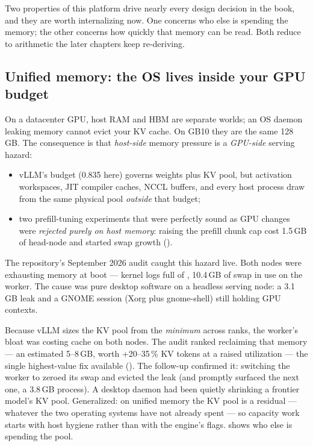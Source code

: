Two properties of this platform drive nearly every design decision in the
book, and they are worth internalizing now. One concerns who else is
spending the memory; the other concerns how quickly that memory can be
read. Both reduce to arithmetic the later chapters keep re-deriving.

\subsection{Unified memory: the OS lives inside your GPU budget}
\label{sec:problem:unified}

On a datacenter GPU, host RAM and HBM are separate worlds; an OS daemon
leaking memory cannot evict your KV cache. On GB10 they are the same
128\,GB. The consequence is that \emph{host-side} memory pressure is a
\emph{GPU-side} serving hazard:

\begin{itemize}
  \item vLLM's  budget (0.835 here) governs
    weights plus KV pool, but activation workspaces, JIT compiler caches,
    NCCL buffers, and every host process draw from the same physical pool
    \emph{outside} that budget;
  \item two prefill-tuning experiments that were perfectly sound as GPU
    changes were \emph{rejected purely on host memory}: raising the prefill
    chunk cap cost 1.5\,GB of head-node  and started
    swap growth ().
\end{itemize}

The repository's September 2026 audit caught this hazard live. Both nodes
were exhausting memory at boot --- kernel logs full of
, 10.4\,GB of swap in use on the worker. The cause
was pure desktop software on a headless serving node: a 3.1\,GB
 leak and a GNOME session (Xorg plus gnome-shell) still
holding GPU contexts.

Because vLLM sizes the KV pool from the \emph{minimum} across ranks, the
worker's bloat was costing cache on both nodes. The audit ranked reclaiming
that memory --- an estimated 5--8\,GB, worth +20--35\,\% KV tokens at a
raised utilization --- the single highest-value fix available
(). The follow-up confirmed it: switching the worker to
 zeroed its swap and evicted the leak (and promptly
surfaced the next one, a 3.8\,GB  process). A desktop
daemon had been quietly shrinking a frontier model's KV pool. Generalized:
on unified memory the KV pool is a residual --- whatever the two operating
systems have not already spent --- so capacity work starts with host
hygiene rather than with the engine's flags.  shows
who else is spending the pool.

